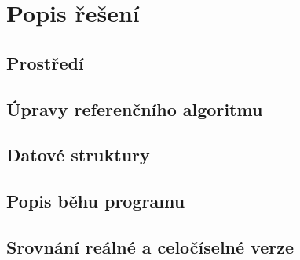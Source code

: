 \chapter{Popis řešení}

\section{Prostředí}

\section{Úpravy referenčního algoritmu}

\section{Datové struktury}

\section{Popis běhu programu}

\section{Srovnání reálné a celočíselné verze}
